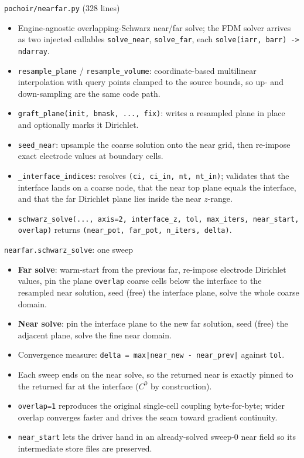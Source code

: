 \documentclass[10pt,aspectratio=169]{beamer}
\newcommand{\ti}[1]{\texttt{\footnotesize #1}}
\begin{document}
\begin{frame}[allowframebreaks]{\texttt{pochoir/nearfar.py} (328 lines)}
  \begin{itemize}\small
  \item Engine-agnostic overlapping-Schwarz near/far solve; the FDM solver arrives as
        two injected callables \ti{solve\_near}, \ti{solve\_far}, each
        \ti{solve(iarr, barr) -> ndarray}.
  \item \ti{resample\_plane} / \ti{resample\_volume}: coordinate-based multilinear
        interpolation with query points clamped to the source bounds, so up- and
        down-sampling are the same code path.
  \item \ti{graft\_plane(init, bmask, ..., fix)}: writes a resampled plane in place and
        optionally marks it Dirichlet.
  \item \ti{seed\_near}: upsample the coarse solution onto the near grid, then re-impose
        exact electrode values at boundary cells.
  \item \ti{\_interface\_indices}: resolves \ti{(ci, ci\_in, nt, nt\_in)}; validates that
        the interface lands on a coarse node, that the near top plane equals the interface,
        and that the far Dirichlet plane lies inside the near $z$-range.
  \item \ti{schwarz\_solve(..., axis=2, interface\_z, tol, max\_iters, near\_start, overlap)}
        returns \ti{(near\_pot, far\_pot, n\_iters, delta)}.
  \end{itemize}
\end{frame}

\begin{frame}[allowframebreaks]{\texttt{nearfar.schwarz\_solve}: one sweep}
  \begin{itemize}\small
  \item \textbf{Far solve}: warm-start from the previous far, re-impose electrode Dirichlet
        values, pin the plane \ti{overlap} coarse cells below the interface to the
        resampled near solution, seed (free) the interface plane, solve the whole coarse
        domain.
  \item \textbf{Near solve}: pin the interface plane to the new far solution, seed (free)
        the adjacent plane, solve the fine near domain.
  \item Convergence measure: \ti{delta = max|near\_new - near\_prev|} against \ti{tol}.
  \item Each sweep ends on the near solve, so the returned near is exactly pinned to the
        returned far at the interface ($C^0$ by construction).
  \item \ti{overlap=1} reproduces the original single-cell coupling byte-for-byte; wider
        overlap converges faster and drives the seam toward gradient continuity.
  \item \ti{near\_start} lets the driver hand in an already-solved sweep-0 near field so its
        intermediate store files are preserved.
  \end{itemize}
\end{frame}
\end{document}
